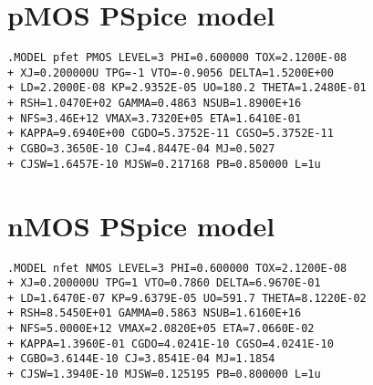 \begin{appendices}
	\section{pMOS PSpice model}
	\label{appendix:pspice_models_pmos}
	\footnotesize{\begin{verbatim}
.MODEL pfet PMOS LEVEL=3 PHI=0.600000 TOX=2.1200E-08
+ XJ=0.200000U TPG=-1 VTO=-0.9056 DELTA=1.5200E+00
+ LD=2.2000E-08 KP=2.9352E-05 UO=180.2 THETA=1.2480E-01
+ RSH=1.0470E+02 GAMMA=0.4863 NSUB=1.8900E+16
+ NFS=3.46E+12 VMAX=3.7320E+05 ETA=1.6410E-01
+ KAPPA=9.6940E+00 CGDO=5.3752E-11 CGSO=5.3752E-11
+ CGBO=3.3650E-10 CJ=4.8447E-04 MJ=0.5027
+ CJSW=1.6457E-10 MJSW=0.217168 PB=0.850000 L=1u
	\end{verbatim}}

	\section{nMOS PSpice model}
	\label{appendix:pspice_models_nmos}
	\footnotesize{\begin{verbatim}
.MODEL nfet NMOS LEVEL=3 PHI=0.600000 TOX=2.1200E-08
+ XJ=0.200000U TPG=1 VTO=0.7860 DELTA=6.9670E-01
+ LD=1.6470E-07 KP=9.6379E-05 UO=591.7 THETA=8.1220E-02
+ RSH=8.5450E+01 GAMMA=0.5863 NSUB=1.6160E+16
+ NFS=5.0000E+12 VMAX=2.0820E+05 ETA=7.0660E-02
+ KAPPA=1.3960E-01 CGDO=4.0241E-10 CGSO=4.0241E-10
+ CGBO=3.6144E-10 CJ=3.8541E-04 MJ=1.1854
+ CJSW=1.3940E-10 MJSW=0.125195 PB=0.800000 L=1u
	\end{verbatim}}
\end{appendices}